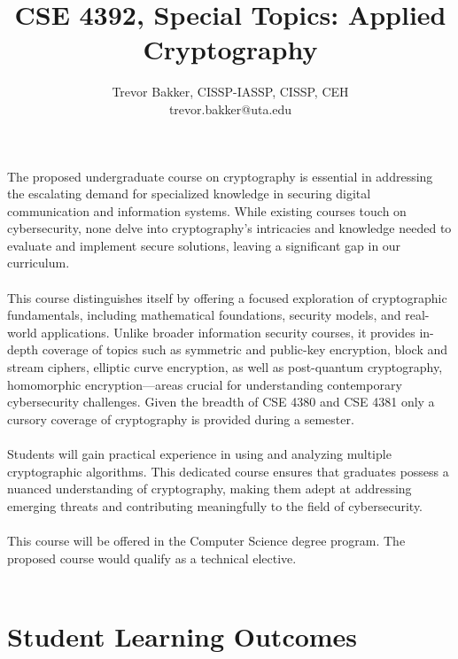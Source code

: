 \documentclass[10pt,a4paper]{article}
\title{CSE 4392,  Special Topics: Applied Cryptography}
\author{Trevor Bakker, CISSP-IASSP, CISSP, CEH\\  trevor.bakker@uta.edu}
\begin{document}
\maketitle


\noindent The proposed undergraduate course on cryptography is essential in addressing the escalating demand for specialized knowledge in securing digital communication and information systems. While existing courses touch on cybersecurity, none delve into cryptography's intricacies and knowledge needed to evaluate and implement secure solutions, leaving a significant gap in our curriculum.\\\\
This course distinguishes itself by offering a focused exploration of cryptographic fundamentals, including mathematical foundations, security models, and real-world applications. Unlike broader information security courses, it provides in-depth coverage of topics such as symmetric and public-key encryption, block and stream ciphers, elliptic curve encryption, as well as post-quantum cryptography, homomorphic encryption—areas crucial for understanding contemporary cybersecurity challenges.  Given the breadth of CSE 4380 and CSE 4381 only a cursory coverage of cryptography is provided during a semester.\\\\
Students will gain practical experience in using and analyzing multiple cryptographic algorithms. This dedicated course ensures that graduates possess a nuanced understanding of cryptography, making them adept at addressing emerging threats and contributing meaningfully to the field of cybersecurity.\\\\
This course will be offered in the Computer Science degree program.  The proposed course would qualify as a technical elective.\\\\

\section*{Student Learning Outcomes}
\end{document}
